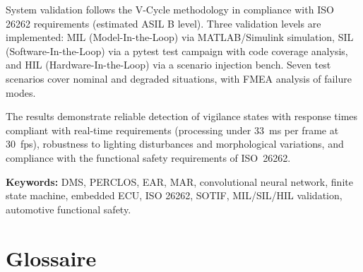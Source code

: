 \documentclass[12pt,a4paper]{report}
\begin{document}
System validation follows the V-Cycle methodology in compliance with ISO 26262 requirements (estimated ASIL B level). Three validation levels are implemented: MIL (Model-In-the-Loop) via MATLAB/Simulink simulation, SIL (Software-In-the-Loop) via a pytest test campaign with code coverage analysis, and HIL (Hardware-In-the-Loop) via a scenario injection bench. Seven test scenarios cover nominal and degraded situations, with FMEA analysis of failure modes.

The results demonstrate reliable detection of vigilance states with response times compliant with real-time requirements (processing under 33~ms per frame at 30~fps), robustness to lighting disturbances and morphological variations, and compliance with the functional safety requirements of ISO~26262.

\vspace{0.5cm}
\noindent\textbf{Keywords:} DMS, PERCLOS, EAR, MAR, convolutional neural network, finite state machine, embedded ECU, ISO 26262, SOTIF, MIL/SIL/HIL validation, automotive functional safety.

\clearpage

\chapter*{Glossaire}
\thispagestyle{fancy}
\end{document}
